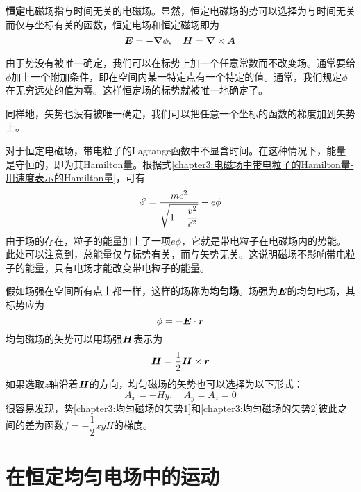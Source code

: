 {\bf 恒定}电磁场指与时间无关的电磁场。显然，恒定电磁场的势可以选择为与时间无关而仅与坐标有关的函数，恒定电场和恒定磁场即为
\begin{equation*}
	\boldsymbol{E} = -\boldsymbol{\nabla} \phi,\quad \boldsymbol{H} = \boldsymbol{\nabla} \times \boldsymbol{A}
\end{equation*}

由于势没有被唯一确定，我们可以在标势上加一个任意常数而不改变场。通常要给$\phi$加上一个附加条件，即在空间内某一特定点有一个特定的值。通常，我们规定$\phi$在无穷远处的值为零。这样恒定场的标势就被唯一地确定了。

同样地，矢势也没有被唯一确定，我们可以把任意一个坐标的函数的梯度加到矢势上。

对于恒定电磁场，带电粒子的Lagrange函数中不显含时间。在这种情况下，能量是守恒的，即为其Hamilton量。根据式\eqref{chapter3:电磁场中带电粒子的Hamilton量-用速度表示的Hamilton量}，可有
\begin{equation}
	\mathscr{E} = \frac{mc^2}{\sqrt{1-\dfrac{v^2}{c^2}}}+e\phi
	\label{chapter3:恒定电磁场中带电粒子的总能量}
\end{equation}
由于场的存在，粒子的能量加上了一项$e\phi$，它就是带电粒子在电磁场内的势能。此处可以注意到，总能量仅与标势有关，而与矢势无关。这说明磁场不影响带电粒子的能量，只有电场才能改变带电粒子的能量。

假如场强在空间所有点上都一样，这样的场称为{\bf 均匀场}。场强为$\boldsymbol{E}$的均匀电场，其标势应为
\begin{equation}
	\phi = -\boldsymbol{E}\cdot \boldsymbol{r}
	\label{chapter3:恒定均匀电场的标势}
\end{equation}
均匀磁场的矢势可以用场强$\boldsymbol{H}$表示为
\begin{equation}
	\boldsymbol{H} = \frac12 \boldsymbol{H}\times \boldsymbol{r}
	\label{chapter3:均匀磁场的矢势1}
\end{equation}
如果选取$z$轴沿着$\boldsymbol{H}$的方向，均匀磁场的矢势也可以选择为以下形式：
\begin{equation}
	A_x = -Hy,\quad A_y = A_z = 0
	\label{chapter3:均匀磁场的矢势2}
\end{equation}
很容易发现，势\eqref{chapter3:均匀磁场的矢势1}和\eqref{chapter3:均匀磁场的矢势2}彼此之间的差为函数$f = -\dfrac12 xyH$的梯度。

\section{在恒定均匀电场中的运动}\label{chapter3:section:在恒定均匀电场中的运动}


